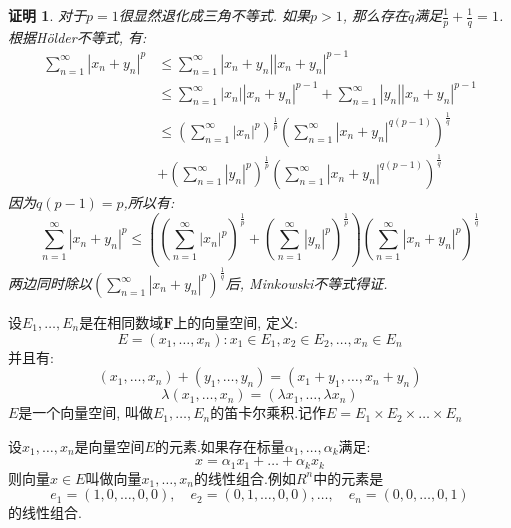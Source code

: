 \documentclass[a4paper,11pt]{article}
\theoremstyle{mystyle}
\newtheorem{Proof}{\hspace{2em}证明}[section]
\begin{document}
\begin{Proof}
  对于$p=1$很显然退化成三角不等式. 如果$p>1$, 那么存在$q$满足$\frac{1}{p}+\frac{1}{q}=1$. 根据H\"{o}lder不等式, 有:
  \begin{equation*}
  \begin{split}
     \sum_{n=1}^{\infty}|x_n+y_n|^p&\leq\sum_{n=1}^{\infty}|x_n+y_n||x_n+y_n|^{p-1}\\
       &\leq\sum_{n=1}^{\infty}|x_n||x_n+y_n|^{p-1}+\sum_{n=1}^{\infty}|y_n||x_n+y_n|^{p-1}\\
       &\leq(\sum_{n=1}^{\infty}|x_n|^p)^\frac{1}{p}(\sum_{n=1}^{\infty}|x_n+y_n|^{q(p-1)})^\frac{1}{q}\\
       &+(\sum_{n=1}^{\infty}|y_n|^p)^\frac{1}{p}(\sum_{n=1}^{\infty}|x_n+y_n|^{q(p-1)})^\frac{1}{q}
  \end{split}
  \end{equation*}
  因为$q(p-1)=p$,所以有:
  \begin{equation*}
    \sum_{n=1}^{\infty}|x_n+y_n|^p\leq ((\sum_{n=1}^{\infty}|x_n|^p)^\frac{1}{p}+(\sum_{n=1}^{\infty}|y_n|^p)^\frac{1}{p})(\sum_{n=1}^{\infty}|x_n+y_n|^{p})^\frac{1}{q}
  \end{equation*}
  两边同时除以$(\sum_{n=1}^{\infty}|x_n+y_n|^p)^{\frac{1}{q}}$后, Minkowski不等式得证.
\end{Proof}
\begin{definition}[向量空间的笛卡尔乘积]
  设$E_1,\dots,E_n$是在相同数域$\mathbf{F}$上的向量空间, 定义:
  \begin{equation*}
    E={(x_1,\dots,x_n):x_1\in E_1,x_2\in E_2,\dots,x_n\in E_n}
  \end{equation*}
  并且有:
  \begin{equation*}
    (x_1,\dots,x_n)+(y_1,\dots,y_n)=(x_1+y_1,\dots,x_n+y_n)
  \end{equation*}
  \begin{equation*}
    \lambda(x_1,\dots,x_n)=(\lambda x_1,\dots,\lambda x_n)
  \end{equation*}
  $E$是一个向量空间, 叫做$E_1,\dots,E_n$的笛卡尔乘积.记作$E=E_1\times E_2\times\dots\times E_n$
\end{definition}
设$x_1,\dots,x_n$是向量空间$E$的元素.如果存在标量$\alpha_1,\dots,\alpha_k$满足:
\begin{equation*}
  x=\alpha_1x_1+\dots+\alpha_kx_k
\end{equation*}
则向量$x\in E$叫做向量$x_1,\dots,x_n$的线性组合.例如$R^n$中的元素是
\begin{equation*}
  e_1=(1,0,\dots,0,0),\quad e_2=(0,1,\dots,0,0),\dots,\quad e_n=(0,0,\dots,0,1)
\end{equation*}
的线性组合.
\end{document}
